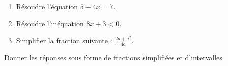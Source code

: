 
\begin{exercice}\label{exosmath-0412}

    \begin{enumerate}
        \item
            Résoudre l'équation \( 5-4x=7\).
        \item
            Résoudre l'inéquation \( 8x+3 < 0\).
        \item
            Simplifier la fraction suivante : \( \frac{\displaystyle 2a+a^2 }{ \displaystyle 4a }\).
    \end{enumerate}
    Donner les réponses sous forme de fractions simplifiées et d'intervalles.

\end{exercice}
